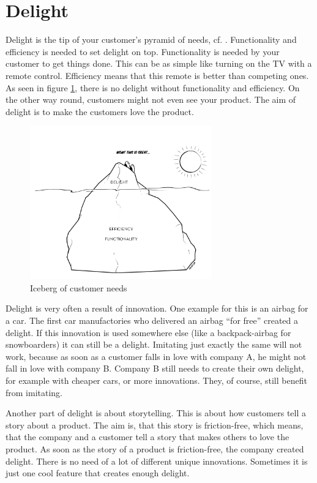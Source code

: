 \section{Delight}
Delight is the tip of your customer's pyramid of needs, cf. \cite{Ramfelt}. Functionality and efficiency is needed to set delight on top. Functionality is needed by your customer to get things done. This can be as simple like turning on the TV with a remote control. Efficiency means that this remote is better than competing ones. As seen in figure \ref{fig:DelightIceberg}, there is no delight without functionality and efficiency. On the other way round, customers might not even see your product. The aim of delight is to make the customers love the product.
\begin{figure}[ht!]
  \centering
    \includegraphics[width=0.7\textwidth]{images/delight}
	\caption{Iceberg of customer needs}
	\label{fig:DelightIceberg}
\end{figure}


Delight is very often a result of innovation. One example for this is an airbag for a car. The first car manufactories who delivered an airbag “for free” created a delight. If this innovation is used somewhere else (like a backpack-airbag for snowboarders) it can still be a delight. Imitating just exactly the same will not work, because as soon as a customer falls in love with company A, he might not fall in love with company B. Company B still needs to create their own delight, for example with cheaper cars, or more innovations. They, of course, still benefit from imitating.

Another part of delight is about storytelling. This is about how customers tell a story about a product. The aim is, that this story is friction-free, which means, that the company and a customer tell a story that makes others to love the product. As soon as the story of a product is friction-free, the company created delight. There is no need of a lot of different unique innovations. Sometimes it is just one cool feature that creates enough delight.


